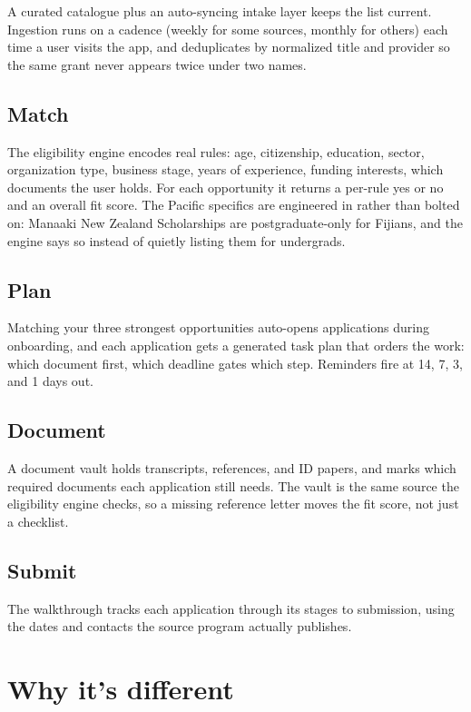 \documentclass[11pt]{article}
\begin{document}
A curated catalogue plus an auto-syncing intake layer keeps the list current. Ingestion runs on a cadence (weekly for some sources, monthly for others) each time a user visits the app, and deduplicates by normalized title and provider so the same grant never appears twice under two names.

\subsection{Match}

The eligibility engine encodes real rules: age, citizenship, education, sector, organization type, business stage, years of experience, funding interests, which documents the user holds. For each opportunity it returns a per-rule yes or no and an overall fit score. The Pacific specifics are engineered in rather than bolted on: Manaaki New Zealand Scholarships are postgraduate-only for Fijians, and the engine says so instead of quietly listing them for undergrads.

\subsection{Plan}

Matching your three strongest opportunities auto-opens applications during onboarding, and each application gets a generated task plan that orders the work: which document first, which deadline gates which step. Reminders fire at 14, 7, 3, and 1 days out.

\subsection{Document}

A document vault holds transcripts, references, and ID papers, and marks which required documents each application still needs. The vault is the same source the eligibility engine checks, so a missing reference letter moves the fit score, not just a checklist.

\subsection{Submit}

The walkthrough tracks each application through its stages to submission, using the dates and contacts the source program actually publishes.

\section{Why it's different}
\end{document}
